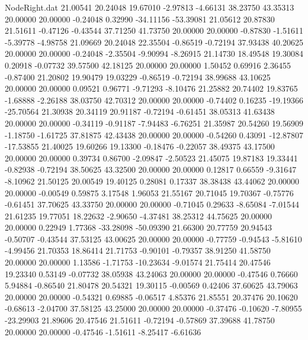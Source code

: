 \begin{filecontents}{NodeRight.dat}
  21.00541   20.24048   19.67010    -2.97813   -4.66131   38.23750   43.35313   20.00000   20.00000   -0.24048    0.32990  -34.11156  -53.39081
  21.05612   20.87830   21.51611    -0.47126   -0.43544   37.71250   41.73750   20.00000   20.00000   -0.87830   -1.51611   -5.39778   -4.98758
  21.09669   20.24048   22.35504    -0.86519   -0.72194   37.93438   40.20625   20.00000   20.00000   -0.24048   -2.35504   -9.90994   -8.26915
  21.14730   18.49548   19.30084     0.20918   -0.07732   39.57500   42.18125   20.00000   20.00000    1.50452    0.69916    2.36455   -0.87400
  21.20802   19.90479   19.03229    -0.86519   -0.72194   38.99688   43.10625   20.00000   20.00000    0.09521    0.96771   -9.71293   -8.10476
  21.25882   20.74402   19.83765    -1.68888   -2.26188   38.03750   42.70312   20.00000   20.00000   -0.74402    0.16235  -19.19366  -25.70564
  21.30938   20.34119   20.91187    -0.72194   -0.61451   38.05313   41.63438   20.00000   20.00000   -0.34119   -0.91187   -7.94483   -6.76251
  21.35987   20.54260   19.56909    -1.18750   -1.61725   37.81875   42.43438   20.00000   20.00000   -0.54260    0.43091  -12.87807  -17.53855
  21.40025   19.60266   19.13300    -0.18476   -0.22057   38.49375   43.17500   20.00000   20.00000    0.39734    0.86700   -2.09847   -2.50523
  21.45075   19.87183   19.33441    -0.82938   -0.72194   38.50625   43.32500   20.00000   20.00000    0.12817    0.66559   -9.31647   -8.10962
  21.50125   20.00549   19.40125     0.28081    0.17337   38.38438   43.44062   20.00000   20.00000   -0.00549    0.59875    3.17548    1.96053
  21.55167   20.71045   19.70367    -0.75776   -0.61451   37.70625   43.33750   20.00000   20.00000   -0.71045    0.29633   -8.65084   -7.01544
  21.61235   19.77051   18.22632    -2.90650   -4.37481   38.25312   44.75625   20.00000   20.00000    0.22949    1.77368  -33.28098  -50.09390
  21.66300   20.77759   20.94543    -0.50707   -0.43544   37.53125   43.00625   20.00000   20.00000   -0.77759   -0.94543   -5.81610   -4.99456
  21.70353   18.86414   21.71753    -0.90101   -0.79357   38.91250   41.58750   20.00000   20.00000    1.13586   -1.71753  -10.23634   -9.01574
  21.75414   20.47546   19.23340     0.53149   -0.07732   38.05938   43.24063   20.00000   20.00000   -0.47546    0.76660    5.94884   -0.86540
  21.80478   20.54321   19.30115    -0.00569    0.42406   37.60625   43.79063   20.00000   20.00000   -0.54321    0.69885   -0.06517    4.85376
  21.85551   20.37476   20.10620    -0.68613   -2.04700   37.58125   43.25000   20.00000   20.00000   -0.37476   -0.10620   -7.80955  -23.29903
  21.89606   20.47546   21.51611    -0.72194   -0.57869   37.39688   41.78750   20.00000   20.00000   -0.47546   -1.51611   -8.25417   -6.61636

\end{filecontents}
